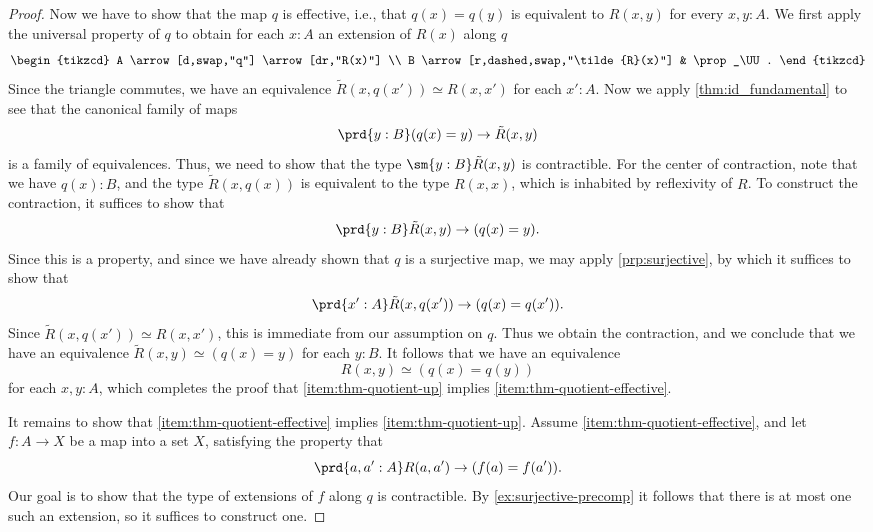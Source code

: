 \begin{proof}
  Now we have to show that the map $q$ is effective, i.e., that $q(x)=q(y)$ is equivalent to $R(x,y)$ for every $x,y:A$. We first apply the universal property of $q$ to obtain for each $x:A$ an extension of $R(x)$ along $q$
  \begin{equation*}
    \begin{tikzcd}
      A \arrow[d,swap,"q"] \arrow[dr,"R(x)"] \\
      B \arrow[r,dashed,swap,"\tilde{R}(x)"] & \prop_\UU.
    \end{tikzcd}
  \end{equation*}
  Since the triangle commutes, we have an equivalence $\tilde{R}(x,q(x'))\simeq R(x,x')$ for each $x':A$. Now we apply \cref{thm:id_fundamental} to see that the canonical family of maps
  \begin{equation*}
    \prd{y:B}(q(x)=y)\to \tilde{R}(x,y)
  \end{equation*}
  is a family of equivalences. Thus, we need to show that the type $\sm{y:B}\tilde{R}(x,y)$ is contractible. For the center of contraction, note that we have $q(x):B$, and the type $\tilde{R}(x,q(x))$ is equivalent to the type $R(x,x)$, which is inhabited by reflexivity of $R$. To construct the contraction, it suffices to show that
  \begin{equation*}
    \prd{y:B}\tilde{R}(x,y)\to (q(x)=y).
  \end{equation*}
  Since this is a property, and since we have already shown that $q$ is a surjective map, we may apply \cref{prp:surjective}, by which it suffices to show that
  \begin{equation*}
    \prd{x':A}\tilde{R}(x,q(x'))\to (q(x)=q(x')).
  \end{equation*}
  Since $\tilde{R}(x,q(x'))\simeq R(x,x')$, this is immediate from our assumption on $q$. Thus we obtain the contraction, and we conclude that we have an equivalence $\tilde{R}(x,y)\simeq (q(x)=y)$ for each $y:B$. It follows that we have an equivalence
  \begin{equation*}
    R(x,y)\simeq (q(x)=q(y))
  \end{equation*}
  for each $x,y:A$, which completes the proof that \ref{item:thm-quotient-up} implies \ref{item:thm-quotient-effective}.
  
  It remains to show that \ref{item:thm-quotient-effective} implies \ref{item:thm-quotient-up}. Assume \ref{item:thm-quotient-effective}, and let $f:A\to X$ be a map into a set $X$, satisfying the property that
  \begin{equation*}
    \prd{a,a':A}R(a,a')\to (f(a)=f(a')).
  \end{equation*}
  Our goal is to show that the type of extensions of $f$ along $q$ is contractible. By \cref{ex:surjective-precomp} it follows that there is at most one such an extension, so it suffices to construct one.


\end{proof}
